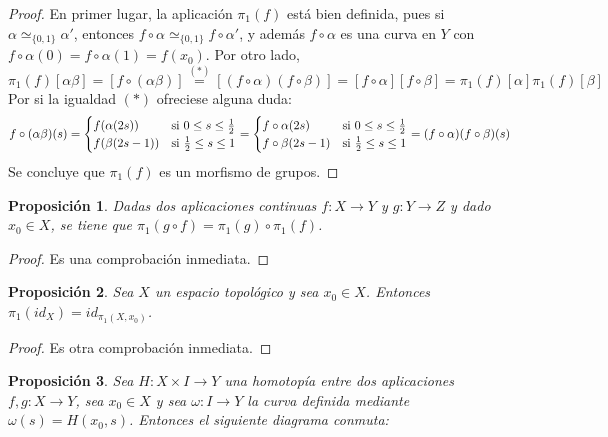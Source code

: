 \documentclass[11pt]{report}
\newtheorem{proposition}{Proposición}[chapter]
\theoremstyle{definition}
\theoremstyle{definition}
\theoremstyle{remark}
\begin{document}
\begin{proof}
En primer lugar, la aplicación $\pi_1(f)$ está bien definida, pues si $\alpha \simeq_{\{0,1\}} \alpha'$, entonces $f \circ \alpha \simeq_{\{0,1\}} f \circ \alpha'$, y además $f \circ \alpha$ es una curva en $Y$ con $f \circ \alpha(0)= f \circ \alpha(1) = f(x_0)$. Por otro lado,
\[\pi_1(f)[\alpha\beta] = [f \circ (\alpha\beta)] \overset{(\ast)}{=} [(f \circ \alpha)(f \circ \beta)] = [f \circ \alpha][f \circ \beta] = \pi_1(f)[\alpha]\pi_1(f)[\beta]\]
Por si la igualdad $(\ast)$ ofreciese alguna duda:
\[f\circ(\alpha\beta)(s) = \begin{cases}
    f(\alpha(2s)) & $si$ \ 0 \leq s \leq \frac{1}{2} \\
    f(\beta(2s-1)) & $si$ \ \frac{1}{2} \leq s \leq 1
\end{cases} = \begin{cases}
    f \circ \alpha(2s) & $si$ \ 0 \leq s \leq \frac{1}{2} \\
    f \circ \beta(2s-1) & $si$ \ \frac{1}{2} \leq s \leq 1
\end{cases} = (f \circ \alpha)(f \circ \beta)(s)\]
Se concluye que $\pi_1(f)$ es un morfismo de grupos.
\end{proof}

\begin{proposition}
Dadas dos aplicaciones continuas $f \colon X \to Y$ y $g \colon Y \to Z$ y dado $x_0 \in X$, se tiene que $\pi_1(g \circ f) = \pi_1(g) \circ \pi_1(f)$.
\end{proposition}

\begin{proof}
Es una comprobación inmediata.
\end{proof}

\begin{proposition}
Sea $X$ un espacio topológico y sea $x_0 \in X$. Entonces $\pi_1(id_X) = id_{\pi_1(X,x_0)}$.
\end{proposition}

\begin{proof}
Es otra comprobación inmediata.
\end{proof}

\begin{proposition}
\label{prop2.11.}
Sea $H \colon X \times I \to Y$ una homotopía entre dos aplicaciones $f,g\colon X \to Y$, sea $x_0 \in X$ y sea $\omega \colon I \to Y$ la curva definida mediante $\omega(s) = H(x_0,s)$. Entonces el siguiente diagrama conmuta:
\begin{center}
\end{center}
\end{proposition}
\end{document}
